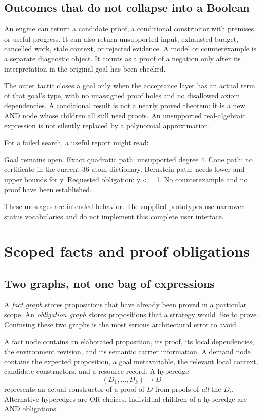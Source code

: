 \documentclass[11pt,letterpaper]{article}
\theoremstyle{definition}
\theoremstyle{remark}
\begin{document}
\subsection{Outcomes that do not collapse into a Boolean}
An engine can return a candidate proof, a conditional constructor with premises, or useful progress. It can also return unsupported input, exhausted budget, cancelled work, stale context, or rejected evidence. A model or counterexample is a separate diagnostic object. It counts as a proof of a negation only after its interpretation in the original goal has been checked.

The outer tactic closes a goal only when the acceptance layer has an actual term of that goal's type, with no unassigned proof holes and no disallowed axiom dependencies. A conditional result is not a nearly proved theorem: it is a new AND node whose children all still need proofs. An unsupported real-algebraic expression is not silently replaced by a polynomial approximation.

For a failed search, a useful report might read:
\begin{code}
Goal remains open.
  Exact quadratic path: unsupported degree 4.
  Cone path: no certificate in the current 36-atom dictionary.
  Bernstein path: needs lower and upper bounds for y.
  Requested obligation: y <= 1.
  No counterexample and no proof have been established.
\end{code}
These messages are intended behavior. The supplied prototypes use narrower status vocabularies and do not implement this complete user interface.

\section{Scoped facts and proof obligations}
\subsection{Two graphs, not one bag of expressions}
A \emph{fact graph} stores propositions that have already been proved in a particular scope. An \emph{obligation graph} stores propositions that a strategy would like to prove. Confusing these two graphs is the most serious architectural error to avoid.

A fact node contains an elaborated proposition, its proof, its local dependencies, the environment revision, and its semantic carrier information. A demand node contains the expected proposition, a goal metavariable, the relevant local context, candidate constructors, and a resource record. A hyperedge
\[
(D_1,\ldots,D_k)\longrightarrow D
\]
represents an actual constructor of a proof of $D$ from proofs of \emph{all} the $D_i$. Alternative hyperedges are OR choices. Individual children of a hyperedge are AND obligations.
\end{document}
